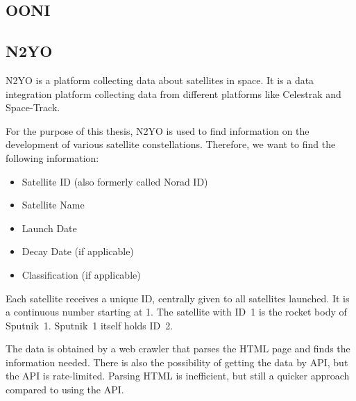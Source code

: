 \subsection{OONI} \label{sec:ooni}

\subsection{N2YO} \label{sec:n2yo}

N2YO is a platform collecting data about satellites in space. It is a data
integration platform collecting data from different platforms like Celestrak
and Space-Track.

For the purpose of this thesis, N2YO is used to find information on the
development of various satellite constellations. Therefore, we want to find the
following information:

\begin{itemize}
	\item Satellite ID (also formerly called Norad ID)
	\item Satellite Name
	\item Launch Date
	\item Decay Date (if applicable)
	\item Classification (if applicable)
\end{itemize}

Each satellite receives a unique ID, centrally given to all satellites
launched. It is a continuous number starting at 1. The satellite with ID~1 is
the rocket body of Sputnik~1. Sputnik~1 itself holds ID~2.

The data is obtained by a web crawler that parses the HTML page and finds the
information needed. There is also the possibility of getting the data by API,
but the API is rate-limited. Parsing HTML is inefficient, but still a quicker
approach compared to using the API.
